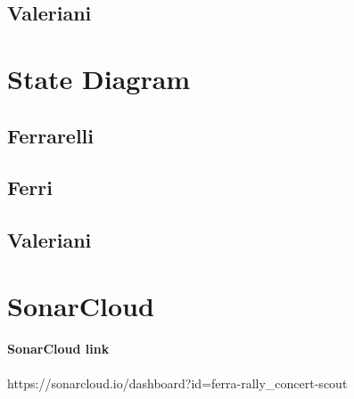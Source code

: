 \documentclass[11pt,a4paper]{article}
\begin{document}
\subsection{Valeriani}
\section{State Diagram}
\subsection{Ferrarelli}
\subsection{Ferri}
\subsection{Valeriani}
\section{SonarCloud}
\paragraph{SonarCloud link} https://sonarcloud.io/dashboard?id=ferra-rally\_concert-scout
\end{document}
